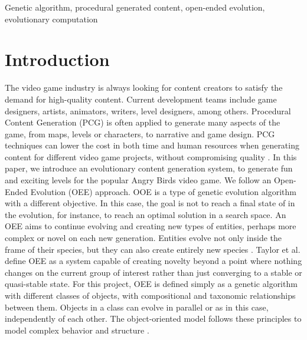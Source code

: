 \documentclass[conference]{IEEEtran}
\begin{document}
\begin{IEEEkeywords}
Genetic algorithm, procedural generated content, open-ended evolution,
evolutionary computation
\end{IEEEkeywords}
    
\section{Introduction}
The video game industry is always looking for content creators to satisfy
the demand for high-quality content. Current development teams include game
designers,  artists, animators,  writers, level designers, among others.
Procedural Content Generation (PCG) is often applied to generate many
aspects of the game, from maps, levels or characters, to narrative and game
design. PCG techniques can lower the cost in both time and human resources
when generating content for different video game projects, without
compromising quality \cite{Yannakakis2017,YannakakisContentGeneration}. In
this paper, we introduce an evolutionary content generation system, to
generate fun and exciting levels for the popular Angry Birds video game. We
follow an Open-Ended Evolution (OEE) approach.  OOE is a type of genetic
evolution algorithm with a different objective. In this case, the goal is
not to reach a final state of in the evolution, for instance, to reach an
optimal solution in a search space. An OEE aims to continue evolving and
creating new types of entities, perhaps more complex or novel on each new
generation. Entities evolve not only inside the frame of their species, but
they can also create entirely new species \cite{Standish2003}. Taylor et al.
\cite{Taylor2016, Taylor} define OEE as a system capable of creating novelty
beyond a point where nothing changes on the current group of interest rather
than just converging to a stable or quasi-stable state. For this project,
OEE is defined simply as a genetic algorithm with different classes of
objects, with compositional and taxonomic relationships between them.
Objects in a class can evolve in parallel or as in this case, independently
of each other. The object-oriented model follows these principles to model
complex behavior and structure \cite{levesque1986knowledge}. 
\end{document}
